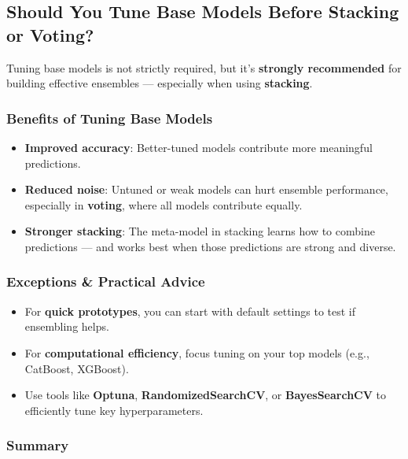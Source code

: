 \documentclass[
  letterpaper,
  DIV=11,
  numbers=noendperiod]{scrreprt}
\providecommand{\tightlist}{%
  \setlength{\itemsep}{0pt}\setlength{\parskip}{0pt}}\usepackage{longtable,booktabs,array}
\begin{document}
\subsection{Should You Tune Base Models Before Stacking or
Voting?}\label{should-you-tune-base-models-before-stacking-or-voting}

Tuning base models is not strictly required, but it's \textbf{strongly
recommended} for building effective ensembles --- especially when using
\textbf{stacking}.

\subsubsection{Benefits of Tuning Base
Models}\label{benefits-of-tuning-base-models}

\begin{itemize}
\tightlist
\item
  \textbf{Improved accuracy}: Better-tuned models contribute more
  meaningful predictions.
\item
  \textbf{Reduced noise}: Untuned or weak models can hurt ensemble
  performance, especially in \textbf{voting}, where all models
  contribute equally.
\item
  \textbf{Stronger stacking}: The meta-model in stacking learns how to
  combine predictions --- and works best when those predictions are
  strong and diverse.
\end{itemize}

\subsubsection{Exceptions \& Practical
Advice}\label{exceptions-practical-advice}

\begin{itemize}
\tightlist
\item
  For \textbf{quick prototypes}, you can start with default settings to
  test if ensembling helps.
\item
  For \textbf{computational efficiency}, focus tuning on your top models
  (e.g., CatBoost, XGBoost).
\item
  Use tools like \textbf{Optuna}, \textbf{RandomizedSearchCV}, or
  \textbf{BayesSearchCV} to efficiently tune key hyperparameters.
\end{itemize}

\subsubsection{Summary}\label{summary}
\end{document}
